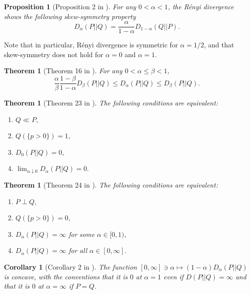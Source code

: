 \documentclass[12pt,a4paper,oneside]{article}
\numberwithin{equation}{section}
\theoremstyle{definition}  %
\theoremstyle{plain}  %
\newtheorem{thm}[defn]{Theorem}
\newtheorem{prop}[defn]{Proposition}
\newtheorem{cor}[defn]{Corollary}
\theoremstyle{remark} %
\begin{document}
\begin{prop}
[Proposition 2 in \cite{Erven-Harremos-2014}]\label{prop:8-veh}
For any $0<\alpha<1$, the R\'enyi divergence shows the following skew-symmetry property \[D_\alpha(P||Q) = \frac{\alpha}{1-\alpha}D_{1-\alpha}(Q||P).\]
\end{prop}
Note that in particular, R\'enyi divergence is symmetric for $\alpha=1/2$, and that skew-symmetry does not hold for $\alpha = 0$ and $\alpha = 1$. 


\begin{thm}
[Theorem 16 in \cite{Erven-Harremos-2014}]\label{thm:16-veh}
For any $0<\alpha\leq \beta <1$,\[\frac{\alpha}{\beta}\frac{1-\beta}{1-\alpha}D_{\beta}(P||Q)\leq D_\alpha (P||Q)\leq D_{\beta}(P||Q).\]
\end{thm}

\begin{thm}
[Theorem 23 in \cite{Erven-Harremos-2014}]\label{thm:23-veh}The following conditions are equivalent:
\begin{enumerate}
    \item \label{item:vEH-1}$Q\ll P,$
    \item \label{item:vEH-2} $Q(\{p>0\}) = 1$,
    \item\label{item:vEH-3} $D_0(P||Q) = 0$,
    \item\label{item:vEH-4} $\lim_{\alpha \downarrow 0} D_{\alpha}(P||Q) = 0.$
\end{enumerate}
\end{thm}
\begin{thm}
[Theorem 24 in \cite{Erven-Harremos-2014}]\label{thm:24-veh}The following conditions are equivalent:
\begin{enumerate}
    \item \label{item:vEH-5}$P\perp Q,$
    \item \label{item:vEH-6} $Q(\{p>0\}) = 0$,
    \item\label{item:vEH-7} $D_{\alpha}(P||Q) = \infty$ for some $\alpha\in [0,1)$,
    \item\label{item:vEH-8} $D_{\alpha}(P||Q) = \infty$ for all $\alpha\in [0,\infty].$
\end{enumerate}
\end{thm}
\begin{cor}[Corollary 2 in \cite{Erven-Harremos-2014}]\label{cor:2-veh}
The function $[0, \infty] \ni \alpha \mapsto (1-\alpha)D_{\alpha}(P||Q)$ is concave, with the conventions that it is $0$ at $\alpha = 1$ even if $D(P||Q) = \infty$ and that it is $0$ at $\alpha = \infty$ if $P=Q$.
\end{cor}
\end{document}
